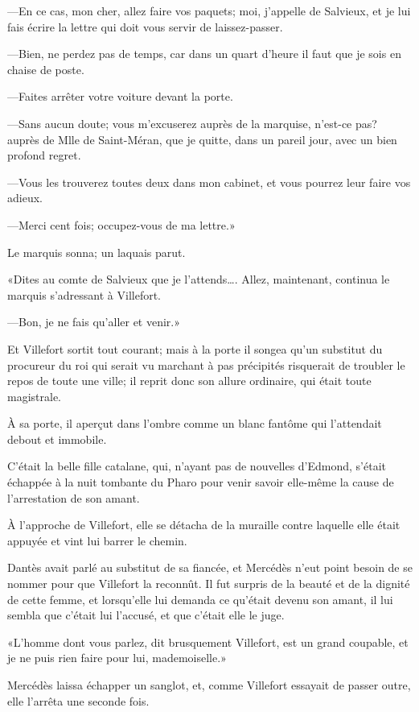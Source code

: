 —En ce cas, mon cher, allez faire vos paquets; moi, j'appelle de Salvieux, et je lui fais écrire la lettre qui doit vous servir de laissez-passer.

—Bien, ne perdez pas de temps, car dans un quart d'heure il faut que je sois en chaise de poste.

—Faites arrêter votre voiture devant la porte.

—Sans aucun doute; vous m'excuserez auprès de la marquise, n'est-ce pas? auprès de Mlle de Saint-Méran, que je quitte, dans un pareil jour, avec un bien profond regret.

—Vous les trouverez toutes deux dans mon cabinet, et vous pourrez leur faire vos adieux.

—Merci cent fois; occupez-vous de ma lettre.»

Le marquis sonna; un laquais parut.

«Dites au comte de Salvieux que je l'attends\dots. Allez, maintenant, continua le marquis s'adressant à Villefort.

—Bon, je ne fais qu'aller et venir.»

Et Villefort sortit tout courant; mais à la porte il songea qu'un substitut du procureur du roi qui serait vu marchant à pas précipités risquerait de troubler le repos de toute une ville; il reprit donc son allure ordinaire, qui était toute magistrale.

À sa porte, il aperçut dans l'ombre comme un blanc fantôme qui l'attendait debout et immobile.

C'était la belle fille catalane, qui, n'ayant pas de nouvelles d'Edmond, s'était échappée à la nuit tombante du Pharo pour venir savoir elle-même la cause de l'arrestation de son amant.

À l'approche de Villefort, elle se détacha de la muraille contre laquelle elle était appuyée et vint lui barrer le chemin.

Dantès avait parlé au substitut de sa fiancée, et Mercédès n'eut point besoin de se nommer pour que Villefort la reconnût. Il fut surpris de la beauté et de la dignité de cette femme, et lorsqu'elle lui demanda ce qu'était devenu son amant, il lui sembla que c'était lui l'accusé, et que c'était elle le juge.

«L'homme dont vous parlez, dit brusquement Villefort, est un grand coupable, et je ne puis rien faire pour lui, mademoiselle.»

Mercédès laissa échapper un sanglot, et, comme Villefort essayait de passer outre, elle l'arrêta une seconde fois.

